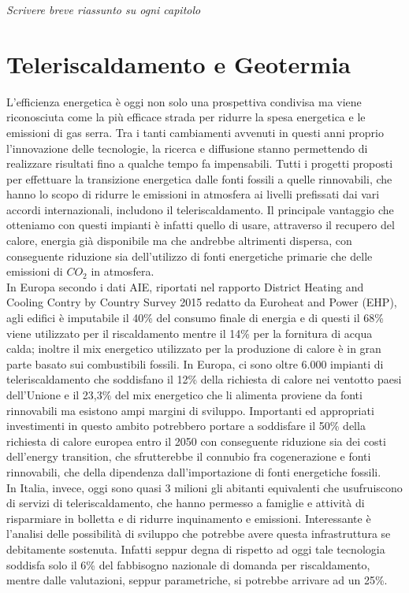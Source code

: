 \documentclass[laurea,oneside,11pt]{USiena_tesiLM}
\begin{document}
\textit{Scrivere breve riassunto su ogni capitolo}

\chapter{Teleriscaldamento e Geotermia}
L'efficienza energetica è oggi non solo una prospettiva condivisa ma viene riconosciuta come la più efficace strada per ridurre la spesa energetica e le emissioni di gas serra. Tra i tanti cambiamenti avvenuti in questi anni proprio l'innovazione delle tecnologie, la ricerca e diffusione stanno permettendo di realizzare risultati fino a qualche tempo fa impensabili. Tutti i progetti proposti per effettuare la transizione energetica dalle fonti fossili a quelle rinnovabili, che hanno lo scopo di ridurre le emissioni in atmosfera ai livelli prefissati dai vari accordi internazionali, includono il teleriscaldamento.
Il principale vantaggio che otteniamo con questi impianti è infatti quello di usare, attraverso il recupero del calore, energia già disponibile ma che andrebbe altrimenti dispersa, con conseguente riduzione sia dell'utilizzo di fonti energetiche primarie che delle emissioni di $CO_2$ in atmosfera.\\

In Europa secondo i dati AIE, riportati nel rapporto District Heating and Cooling Contry by Country Survey 2015 redatto da Euroheat and Power (EHP), agli edifici è imputabile il 40\% del consumo finale di energia e di questi il 68\% viene utilizzato per il riscaldamento mentre il 14\% per la fornitura di acqua calda; inoltre il mix energetico utilizzato per la produzione di calore è in gran parte basato sui combustibili fossili. In Europa, ci sono oltre 6.000 impianti di teleriscaldamento che soddisfano il 12\% della richiesta di calore nei ventotto paesi dell'Unione e il 23,3\% del mix energetico che li alimenta proviene da fonti rinnovabili ma esistono ampi margini di sviluppo. Importanti ed appropriati investimenti in questo ambito potrebbero portare a soddisfare il 50\% della richiesta di calore europea entro il 2050 con conseguente riduzione sia dei costi dell'energy transition, che sfrutterebbe il connubio fra cogenerazione e fonti rinnovabili, che della dipendenza dall'importazione di fonti energetiche fossili.\\

In Italia, invece, oggi sono quasi 3 milioni gli abitanti equivalenti che usufruiscono di servizi di teleriscaldamento, che hanno permesso a famiglie e attività di risparmiare in bolletta e di ridurre inquinamento e emissioni. 
Interessante è l'analisi delle possibilità di sviluppo che potrebbe avere questa infrastruttura se debitamente sostenuta. Infatti seppur degna di rispetto ad oggi tale tecnologia soddisfa solo il 6\% del fabbisogno nazionale di domanda per riscaldamento, mentre dalle valutazioni, seppur parametriche, si potrebbe arrivare ad un 25\%.\\
\end{document}
